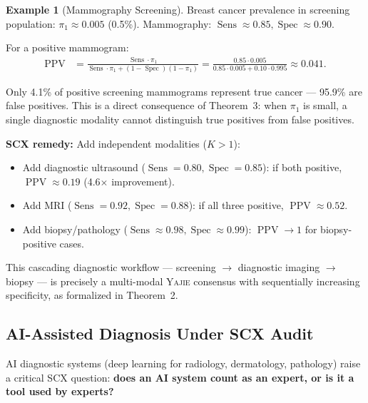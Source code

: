 \documentclass[11pt,a4paper]{article}
\theoremstyle{definition}
\newtheorem{example}[theorem]{Example}
\newcommand{\Yajie}{\textsc{Yajie}}
\DeclareMathOperator{\Sens}{Sens}
\DeclareMathOperator{\Spec}{Spec}
\DeclareMathOperator{\PPV}{PPV}
\begin{document}
\begin{example}[Mammography Screening]
Breast cancer prevalence in screening population: $\pi_1 \approx 0.005$ (0.5\%).
Mammography: $\Sens \approx 0.85, \Spec \approx 0.90$.

For a positive mammogram:
\begin{align}
    \PPV &= \frac{\Sens \cdot \pi_1}{\Sens \cdot \pi_1 + (1-\Spec)(1-\pi_1)}
    = \frac{0.85 \cdot 0.005}{0.85 \cdot 0.005 + 0.10 \cdot 0.995} \approx 0.041.
\end{align}

Only 4.1\% of positive screening mammograms represent true cancer --- 95.9\%
are false positives. This is a direct consequence of Theorem~3: when
$\pi_1$ is small, a single diagnostic modality cannot distinguish true
positives from false positives.

\textbf{SCX remedy:} Add independent modalities ($K > 1$):
\begin{itemize}[nosep]
    \item Add diagnostic ultrasound ($\Sens = 0.80, \Spec = 0.85$): if both
    positive, $\PPV \approx 0.19$ (4.6$\times$ improvement).
    \item Add MRI ($\Sens = 0.92, \Spec = 0.88$): if all three positive,
    $\PPV \approx 0.52$.
    \item Add biopsy/pathology ($\Sens \approx 0.98, \Spec \approx 0.99$):
    $\PPV \to 1$ for biopsy-positive cases.
\end{itemize}
This cascading diagnostic workflow --- screening $\to$ diagnostic imaging
$\to$ biopsy --- is precisely a multi-modal \Yajie{} consensus with sequentially
increasing specificity, as formalized in Theorem~2.
\end{example}

\subsection{AI-Assisted Diagnosis Under SCX Audit}

AI diagnostic systems (deep learning for radiology, dermatology, pathology)
raise a critical SCX question: \textbf{does an AI system count as an expert,
or is it a tool used by experts?}
\end{document}

